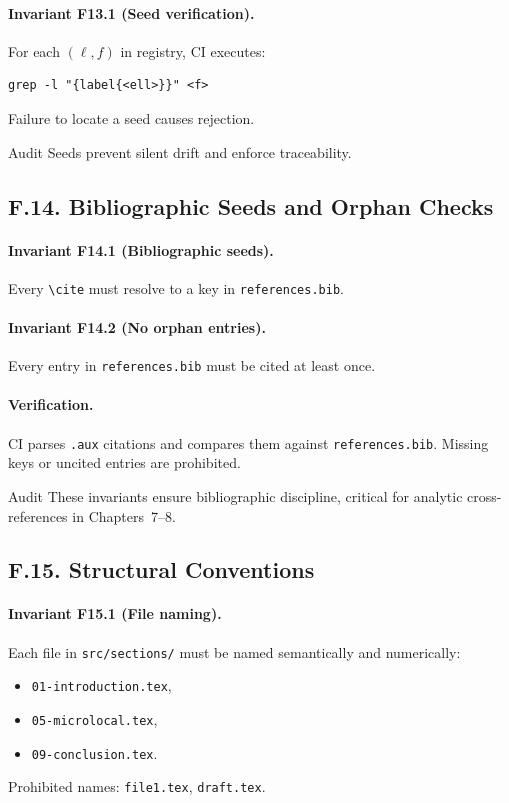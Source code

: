 \paragraph{Invariant F13.1 (Seed verification).}
For each $(\ell,f)$ in registry, CI executes:
\begin{verbatim}
grep -l "{label{<ell>}}" <f>
\end{verbatim}
Failure to locate a seed causes rejection.

\begin{auditblock}{Audit}
Seeds prevent silent drift and enforce traceability.
\end{auditblock}

\subsection*{F.14. Bibliographic Seeds and Orphan Checks}

\paragraph{Invariant F14.1 (Bibliographic seeds).}
Every \texttt{\textbackslash cite} must resolve to a key in
\texttt{references.bib}.

\paragraph{Invariant F14.2 (No orphan entries).}
Every entry in \texttt{references.bib} must be cited at least once.

\paragraph{Verification.}
CI parses \texttt{.aux} citations and compares them against
\texttt{references.bib}. Missing keys or uncited entries are prohibited.

\begin{auditblock}{Audit}
These invariants ensure bibliographic discipline, critical for analytic
cross-references in Chapters~7–8.
\end{auditblock}

\subsection*{F.15. Structural Conventions}

\paragraph{Invariant F15.1 (File naming).}
Each file in \texttt{src/sections/} must be named semantically and
numerically:
\begin{itemize}
  \item \texttt{01-introduction.tex},
  \item \texttt{05-microlocal.tex},
  \item \texttt{09-conclusion.tex}.
\end{itemize}
Prohibited names: \texttt{file1.tex}, \texttt{draft.tex}.

